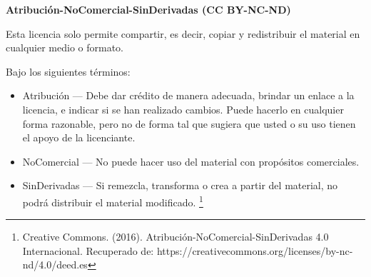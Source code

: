 \documentclass[12pt]{report}%
\begin{document}
\textbf{Atribución-NoComercial-SinDerivadas (CC BY-NC-ND)}

Esta licencia solo permite compartir, es decir,  copiar y redistribuir el material en cualquier medio o formato.

Bajo los siguientes términos:
\begin{itemize}
\item Atribución — Debe dar crédito de manera adecuada, brindar un enlace a la licencia, e indicar si se han realizado cambios. Puede hacerlo en cualquier forma razonable, pero no de forma tal que sugiera que usted o su uso tienen el apoyo de la licenciante.

\item NoComercial — No puede hacer uso del material con propósitos comerciales.

\item SinDerivadas — Si remezcla, transforma o crea a partir del material, no podrá distribuir el material modificado. \footnote{Creative Commons. (2016). Atribución-NoComercial-SinDerivadas 4.0 Internacional. Recuperado de:  https://creativecommons.org/licenses/by-nc-nd/4.0/deed.es}
\end{itemize}
\newpage
\end{document}
